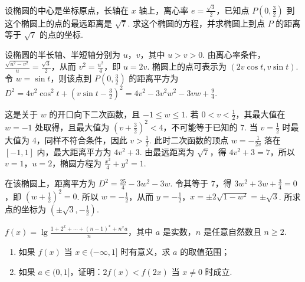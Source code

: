 \begin{problem}
设椭圆的中心是坐标原点，长轴在 \(x\) 轴上，离心率 \(e=\frac{\sqrt{3}}{2}\)，已知点 \(P\left( 0,\frac{3}{2} \right)\) 到这个椭圆上的点的最远距离是 \(\sqrt{7}\). 求这个椭圆的方程，并求椭圆上到点 \(P\) 的距离等于 \(\sqrt{7}\) 的点的坐标.
\end{problem}

\begin{solution}
设椭圆的半长轴、半短轴分别为 \(u\)，\(v\)，其中 \(u>v>0\). 由离心率条件，\(\frac{\sqrt{u^2-v^2}}{u}=\frac{\sqrt{3}}{2}\)，从而 \(v^2=\frac{u^2}{4}\)，即 \(u=2v\). 椭圆上的点可表示为 \((2v\cos t,v\sin t)\). 令 \(w=\sin t\)，则该点到 \(P\left(0,\frac{3}{2}\right)\) 的距离平方为 \(D^2=4v^2\cos^2t+\left(v\sin t-\frac{3}{2}\right)^2=4v^2-3v^2w^2-3vw+\frac{9}{4}\).

这是关于 \(w\) 的开口向下二次函数，且 \(-1\leqslant w\leqslant1\). 若 \(0<v<\frac{1}{2}\)，其最大值在 \(w=-1\) 处取得，且最大值为 \(\left(v+\frac{3}{2}\right)^2<4\)，不可能等于已知的 \(7\). 当 \(v=\frac{1}{2}\) 时最大值为 \(4\)，同样不符合条件，因此 \(v>\frac{1}{2}\). 此时二次函数的顶点 \(w=-\frac{1}{2v}\) 落在 \([-1,1]\) 内，最大距离平方为 \(4v^2+3\). 由最远距离为 \(\sqrt{7}\)，得 \(4v^2+3=7\)，所以 \(v=1\)，\(u=2\)，椭圆方程为 \(\frac{x^2}{4}+y^2=1\).

在该椭圆上，距离平方为 \(D^2=\frac{25}{4}-3w^2-3w\). 令其等于 \(7\)，得 \(3w^2+3w+\frac{3}{4}=0\)，即 \(\left(w+\frac{1}{2}\right)^2=0\). 所以 \(w=-\frac{1}{2}\)，从而 \(y=-\frac{1}{2}\)，\(x=\pm2\sqrt{1-w^2}=\pm\sqrt{3}\). 所求点的坐标为 \(\left(\pm\sqrt{3},-\frac{1}{2}\right)\).
\end{solution}

\begin{problem}
\(f(x)=\lg \frac{1+2^x+\cdots+(n-1)^x+n^xa}{n}\)，其中 \(a\) 是实数，\(n\) 是任意自然数且 \(n\geqslant 2\).
\begin{enumerate}
\item 如果 \(f(x)\) 当 \(x\in(-\infty,1]\) 时有意义，求 \(a\) 的取值范围；
\item 如果 \(a\in(0,1]\)，证明：\(2f(x)<f(2x)\) 当 \(x\neq 0\) 时成立.
\end{enumerate}
\end{problem}

